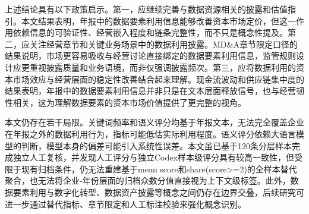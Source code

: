 上述结论具有以下政策启示。第一，应继续完善与数据资源相关的披露和估值指引。本文结果表明，年报中的数据要素利用信息能够改善资本市场定价，但这一作用依赖信息的可验证性、经营嵌入程度和链条完整性，而不只是概念性提及。第二，应关注经营章节和关键业务场景中的数据利用披露。MD\&A章节限定口径的结果说明，市场更容易吸收与经营讨论直接绑定的数据要素利用信息，监管规则设计应更重视披露质量和业务语境，而非仅强调披露频次。第三，应将数据利用的资本市场效应与经营层面的稳定性改善结合起来理解。现金流波动和供应链集中度的结果表明，年报中的数据要素利用信息并非只是在文本层面释放信号，也与经营韧性相关，这为理解数据要素的资本市场价值提供了更完整的视角。

本文仍存在若干局限。关键词频率和语义评分均基于年报文本，无法完全覆盖企业在年报之外的数据利用行为，指标可能低估实际利用程度。语义评分依赖大语言模型的判断，模型本身的偏差可能引入系统性误差。本文虽已基于120条分层样本完成独立人工复核，并发现人工评分与独立Codex样本级评分具有较高一致性，但受限于现有归档条件，仍无法重建基于mean score和share(score\textgreater=2)的全样本替代聚合，也无法将企业-年份层面的归档众数分值直接视为上下文级标签。此外，数据要素利用与数字化转型、数据资产披露等概念之间仍存在边界交叠，后续研究可进一步通过替代指标、章节限定和人工标注校验来强化概念识别。
